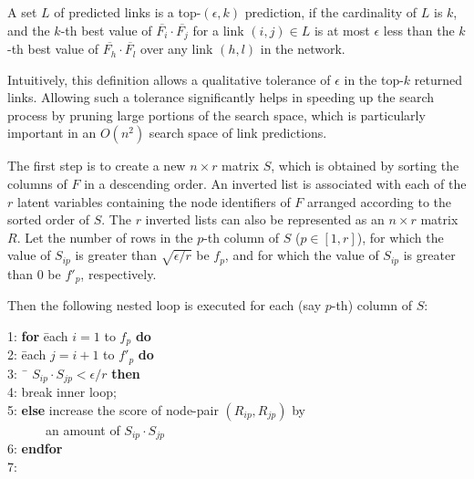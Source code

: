 \begin{definition}[top-$(\epsilon, k)$ predictions]
A set $L$ of predicted links is a top-$(\epsilon, k)$ prediction, if
the cardinality of $L$ is $k$, and the $k$-th best  value of
$\overline{F_i} \cdot \overline{F_j}$ for a link $(i, j) \in L$ is
at most $\epsilon$ less than the $k$-th best value of
$\overline{F_h} \cdot \overline{F_l}$ over any link $(h , l)$ in the
network.
\end{definition}
Intuitively, this definition allows a qualitative  tolerance of
$\epsilon$ in the top-$k$ returned links. Allowing such a tolerance
significantly helps in speeding up the search process by pruning
large portions of the search space, which is particularly important
in an $O(n^2)$ search space of link predictions.

The first step is to create a new $n \times r$ matrix $S$, which is
obtained by sorting the columns of $F$ in a descending order. An inverted list is
associated with each of the $r$ latent variables containing the node
identifiers  of $F$ arranged according to the sorted order of $S$. The
$r$ inverted lists can also be represented as an $n \times r$ matrix
$R$. Let the number of rows in the $p$-th column of $S$ ($p\in[1, r]$), for which
the value of $S_{ip}$ is greater than $\sqrt{\epsilon/r}$ be $f_p$, and for which the value of $S_{ip}$ is greater than 0 be $f'_p$, respectively.

Then the following nested loop is executed for each (say $p$-th) column of $S$:

\vspace{-1ex}
\begin{tabbing}1: \hspace{5ex}\=
{\bf for} \= each $i=1$ to $f_p$ {\bf do}\\
2: \> \= each $j=i+1$ to $f'_p$ {\bf do}\\
3: \>\>\ \= $S_{ip} \cdot S_{jp} < \epsilon/r$ {\bf then}\\
4: \>\>\>\>break inner loop; \\
5: \>\>\> {\bf else} increase the score of node-pair $(R_{ip}, R_{jp})$ by \\
   \>\>\> \ \ \ \ \ \ an amount of $S_{ip} \cdot S_{jp}$\\
6: \>\> {\bf endfor}\\
7: 
\end{tabbing}
\vspace{-1ex}

